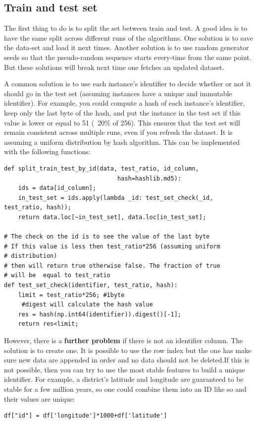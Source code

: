 \documentclass[12pt, letterpaper]{article}
\theoremstyle{definition}
\let\tb\textbf
\begin{document}
\subsection{Train and test set}
The first thing to do is to split the set between train and test. A good idea is to have the same split across different runs of the algorithms. One solution is to save the data-set and load it next times. Another solution is to use random generator seeds so that the pseudo-random sequence starts every-time from the same point. But these solutions will break next time one fetches an updated dataset. 

A common solution is to use each instance's identifier to decide whether or not it should go in the test set (assuming instances have a unique and immutable identifier). For example, you could compute a hash of each instance's identifier, keep only the last byte of the hash, and put the instance in the test set if this value is lower or equal to 51 (~20\% of 256). This ensures that the test set will remain consistent across multiple runs, even if you refresh the dataset. It is assuming a uniform distribution by hash algorithm. This can be implemented with the following functions:

\begin{lstlisting}[caption=Example of function to split according to the last by of the hash on the id.]
def split_train_test_by_id(data, test_ratio, id_column, 
		                        hash=hashlib.md5):
    ids = data[id_column];
    in_test_set = ids.apply(lambda _id: test_set_check(_id,  test_ratio, hash));
    return data.loc[~in_test_set], data.loc[in_test_set];

# The check on the id is to see the value of the last byte
# If this value is less then test_ratio*256 (assuming uniform 
# distribution) 
# then will return true otherwise false. The fraction of true
# will be  equal to test_ratio
def test_set_check(identifier, test_ratio, hash):
    limit = test_ratio*256; #1byte
     #digest will calculate the hash value 
    res = hash(np.int64(identifier)).digest()[-1];
    return res<limit;
\end{lstlisting}

However, there is a \tb{further problem} if there is not an identifier column. The solution is to create one. It is possible to use the row index but the one has make sure new data are appended in order and no data should not be deleted.If this is not possible, then you can try to use the most stable features to build a unique identifier. For example, a district's latitude and longitude are guaranteed to be stable for a few million years, so one could combine them into an ID like so and their values are unique:
\begin{lstlisting}[caption="Creating a column ID from stable features such as latitude and longitude.]
df["id"] = df['longitude']*1000+df['latitude']
\end{lstlisting}
\end{document}
